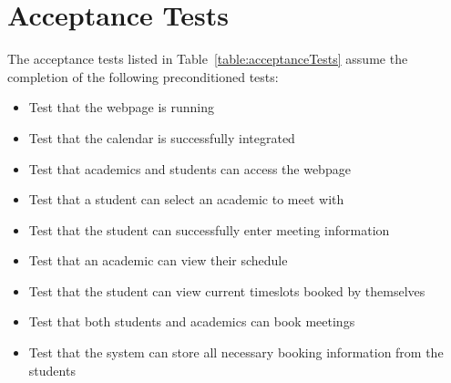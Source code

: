 \documentclass[11pt, a4paper]{article}
\begin{document}
\section{Acceptance Tests}
\noindent
The acceptance tests listed in Table~\ref{table:acceptanceTests} assume the completion of the following preconditioned tests:
\begin{itemize}
	\item Test that the webpage is running 
	\item Test that the calendar is successfully integrated
	\item Test that academics and students can access the webpage
	\item Test that a student can select an academic to meet with 
	\item Test that the student can successfully enter meeting information
	\item Test that an academic can view their schedule
	\item Test that the student can view current timeslots booked by themselves
	\item Test that both students and academics can book meetings
	\item Test that the system can store all necessary booking information from the students
\end{itemize}
\end{document}
